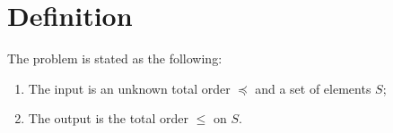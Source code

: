 \section{Definition}
\label{tree:sorting:def}

The problem is stated as the following:

\begin{enumerate}
\item The input is an unknown total order $\preceq$ and a set of elements $S$;
\item The output is the total order $\leq$ on $S$.
\end{enumerate}

